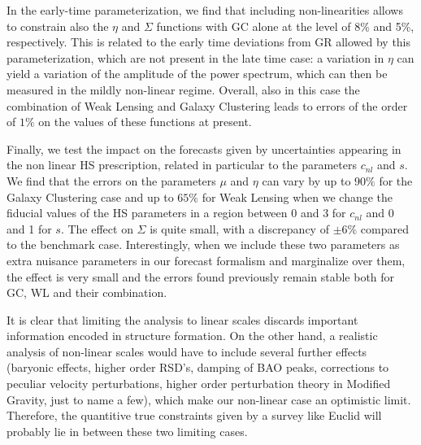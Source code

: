 In the early-time parameterization, we find that including non-linearities allows to constrain also the $\eta$ and $\Sigma$ functions with GC alone at the level of 8\% and 5\%, respectively. This is related to the early time 
deviations from GR allowed by this parameterization, which are not present in the late time case: a variation in $\eta$ can
yield a variation of the amplitude of the power spectrum, which can then be measured in the mildly non-linear regime.
Overall, also in this case the combination of Weak Lensing and Galaxy Clustering leads to errors of the order of $1\%$ on the
values of these functions at present. 


Finally, we test the impact on the forecasts given by uncertainties appearing in the non linear HS prescription, related in particular to the parameters $c_{nl}$ and $s$. We find that
the errors on the parameters $\mu$ and $\eta$ can vary by up to 
$90\%$ for the Galaxy Clustering case and up to $65\%$ for Weak Lensing when we change the fiducial values of the HS parameters in a region between 0 and 3 for $c_{nl}$
and 0 and 1 for $s$. The effect on $\Sigma$ is quite small, with a discrepancy of $\pm 6 \%$ compared to the benchmark case.
Interestingly, when we include these two parameters as extra nuisance parameters in our forecast formalism and marginalize over them, 
the effect is very small and the errors found previously remain stable both for GC, WL and their combination.


It is clear that limiting the analysis to linear scales discards important information encoded in structure formation. On the other hand, a realistic analysis of non-linear scales would have to include several further effects (baryonic effects, higher order RSD's, damping of BAO peaks, corrections
to peculiar velocity perturbations, higher order perturbation theory in Modified Gravity, just to name a few), which make our non-linear case an optimistic limit.
Therefore, the quantitive true constraints given by a survey like Euclid will probably lie in between these two limiting cases. 
\done{}









  


